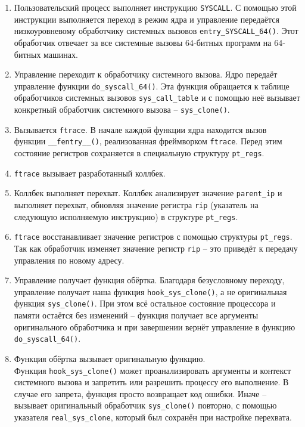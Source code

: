 \begin{enumerate}
	\item Пользовательский процесс выполняет инструкцию \texttt{SYSCALL}. С помощью этой инструкции выполняется переход в режим ядра и управление передаётся низкоуровневому обработчику системных вызовов \texttt{entry\_SYSCALL\_64()}. Этот обработчик отвечает за все системные вызовы 64-битных программ на 64-битных машинах.
	
	\item Управление переходит к обработчику системного вызова. Ядро передаёт управление функции \texttt{do\_syscall\_64()}. Эта функция обращается к таблице обработчиков системных вызовов \texttt{sys\_call\_table} и с помощью неё вызывает конкретный обработчик системного вызова -- \texttt{sys\_clone()}.
	
	\item Вызывается \texttt{ftrace}. В начале каждой функции ядра находится вызов функции \texttt{\_\_fentry\_\_()}, реализованная фреймворком \texttt{ftrace}. Перед этим состояние регистров сохраняется в специальную структуру \texttt{pt\_regs}.
	
	\item \texttt{ftrace} вызывает разработанный коллбек.
	
	\item Коллбек выполняет перехват. Коллбек анализирует значение  \texttt{parent\_ip} и выполняет перехват, обновляя значение регистра \texttt{rip} (указатель на следующую исполняемую инструкцию) в структуре \texttt{pt\_regs}.
	
	\item \texttt{ftrace} восстанавливает значение регистров с помощью структуры \texttt{pt\_regs}. Так как обработчик изменяет значение регистр \texttt{rip} -- это приведёт к передачу управления по новому адресу.
	
	\item Управление получает функция обёртка. Благодаря безусловному переходу, управление получает наша функция \texttt{hook\_sys\_clone()}, а не оригинальная функция \texttt{sys\_clone()}. При этом всё остальное состояние процессора и памяти остаётся без изменений -- функция получает все аргументы оригинального обработчика и при завершении вернёт управление в функцию \texttt{do\_syscall\_64()}.
	
	\item Функция обёртка вызывает оригинальную функцию. \\Функция \texttt{hook\_sys\_clone()} может проанализировать аргументы и контекст системного вызова и запретить или разрешить процессу его выполнение. В случае его запрета, функция просто возвращает код ошибки. Иначе -- вызывает оригинальный обработчик \texttt{sys\_clone()} повторно, с помощью указателя \texttt{real\_sys\_clone}, который был сохранён при настройке перехвата.
	

\end{enumerate}
